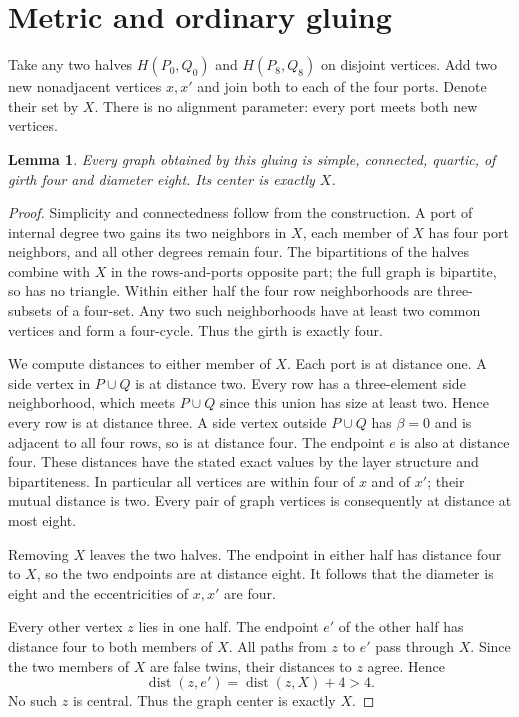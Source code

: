 \documentclass[11pt]{article}
\newtheorem{lemma}[theorem]{Lemma}
\newcommand{\dist}{\operatorname{dist}}
\begin{document}
\section{Metric and ordinary gluing}

Take any two halves $H(P_0,Q_0)$ and $H(P_8,Q_8)$ on disjoint vertices.
Add two new nonadjacent vertices $x,x'$ and join both to each of the
four ports. Denote their set by $X$. There is no alignment parameter:
every port meets both new vertices.

\begin{lemma}\label{metric}
Every graph obtained by this gluing is simple, connected, quartic,
of girth four and diameter eight. Its center is exactly $X$.
\end{lemma}
\begin{proof}
Simplicity and connectedness follow from the construction. A port
of internal degree two gains its two neighbors in $X$, each member
of $X$ has four port neighbors, and all other degrees remain four.
The bipartitions of the halves combine with $X$ in the rows-and-ports
opposite part; the full graph is bipartite, so has no triangle.
Within either half the four row neighborhoods are three-subsets of
a four-set. Any two such neighborhoods have at least two common
vertices and form a four-cycle. Thus the girth is exactly four.

We compute distances to either member of $X$. Each port is at
distance one. A side vertex in $P\cup Q$ is at distance two.
Every row has a three-element side neighborhood, which meets
$P\cup Q$ since this union has size at least two. Hence every row
is at distance three. A side vertex outside $P\cup Q$ has
$\beta=0$ and is adjacent to all four rows, so is at distance four.
The endpoint $e$ is also at distance four. These distances have the
stated exact values by the layer structure and bipartiteness. In
particular all vertices are within four of $x$ and of $x'$; their
mutual distance is two. Every pair of graph vertices is consequently
at distance at most eight.

Removing $X$ leaves the two halves. The endpoint in either half
has distance four to $X$, so the two endpoints are at distance eight.
It follows that the diameter is eight and the eccentricities of
$x,x'$ are four.

Every other vertex $z$ lies in one half. The endpoint $e'$ of the
other half has distance four to both members of $X$. All paths
from $z$ to $e'$ pass through $X$. Since the two members of $X$
are false twins, their distances to $z$ agree. Hence
\[
 \dist(z,e')=\dist(z,X)+4>4.
\]
No such $z$ is central. Thus the graph center is exactly $X$.
\end{proof}
\end{document}
